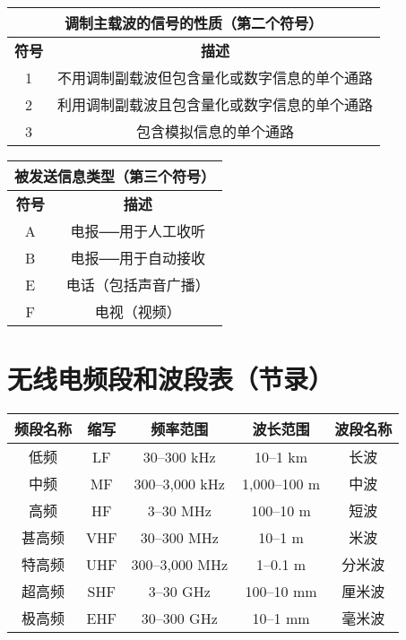 \bigskip

\begin{tabular}{|c|c|}
	\hline
	\multicolumn{2}{|c|}{\textbf{调制主载波的信号的性质（第二个符号）}} \\
	\hline
	\textbf{符号} & \textbf{描述} \\
	\hline
	1 & 不用调制副载波但包含量化或数字信息的单个通路 \\
	\hline
	2 & 利用调制副载波且包含量化或数字信息的单个通路 \\
	\hline
	3 & 包含模拟信息的单个通路 \\
	\hline
\end{tabular}

\bigskip

\begin{tabular}{|c|c|}
	\hline
	\multicolumn{2}{|c|}{\textbf{被发送信息类型（第三个符号）}} \\
	\hline
	\textbf{符号} & \textbf{描述} \\
	\hline
	A & 电报──用于人工收听 \\
	\hline
	B & 电报──用于自动接收 \\
	\hline
	E & 电话（包括声音广播） \\
	\hline
	F & 电视（视频） \\
	\hline
\end{tabular}

\newpage

\section{无线电频段和波段表（节录）}

\begin{tabular}{|c|c|c|c|c|}
	\hline
	\textbf{频段名称} & \textbf{缩写} & \textbf{频率范围} & \textbf{波长范围} & \textbf{波段名称} \\
	\hline
	低频 & LF & 30–300 kHz & 10–1 km & 长波 \\
	\hline
	中频 & MF & 300–3,000 kHz & 1,000–100 m & 中波 \\
	\hline
	高频 & HF & 3–30 MHz & 100–10 m & 短波 \\
	\hline
	甚高频 & VHF & 30–300 MHz & 10–1 m & 米波 \\
	\hline
	特高频 & UHF & 300–3,000 MHz & 1–0.1 m & 分米波 \\
	\hline
	超高频 & SHF & 3–30 GHz & 100–10 mm & 厘米波 \\
	\hline
	极高频 & EHF & 30–300 GHz & 10–1 mm & 毫米波 \\
	\hline
\end{tabular}

